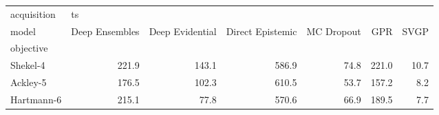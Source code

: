 \begin{tabular}{lrrrrrr}
\toprule
acquisition & \multicolumn{6}{l}{ts} \\
model & Deep Ensembles & Deep Evidential & Direct Epistemic & MC Dropout &    GPR &  SVGP \\
objective  &                &                 &                  &            &        &       \\
\midrule
Shekel-4   &          221.9 &           143.1 &            586.9 &       74.8 &  221.0 &  10.7 \\
Ackley-5   &          176.5 &           102.3 &            610.5 &       53.7 &  157.2 &   8.2 \\
Hartmann-6 &          215.1 &            77.8 &            570.6 &       66.9 &  189.5 &   7.7 \\
\bottomrule
\end{tabular}
